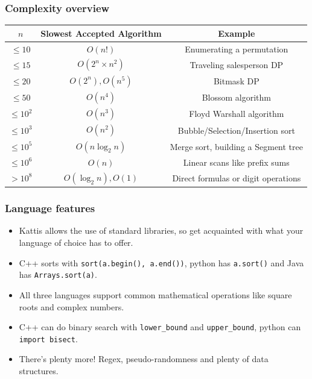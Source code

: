\documentclass{beamer}
\begin{document}
\begin{frame}[plain]
    \frametitle{Complexity overview}
    \scriptsize
    \begin{center}
        \begin{tabular}{c|c|c}
            $n$ & Slowest Accepted Algorithm & Example \\
            \hline
            $\leq 10$ & $O(n!)$ & Enumerating a permutation \\
            $\leq 15$ & $O(2^n\times n^2)$ & Traveling salesperson DP \\
            $\leq 20$ & $O(2^n), O(n^5)$ & Bitmask DP \\
            $\leq 50$ & $O(n^4)$ & Blossom algorithm \\
            $\leq 10^2$ & $O(n^3)$ & Floyd Warshall algorithm \\
            $\leq 10^3$ & $O(n^2)$ & Bubble/Selection/Insertion sort \\
            $\leq 10^5$ & $O(n\log_2{n})$ & Merge sort, building a Segment tree \\
            $\leq 10^6$ & $O(n)$ & Linear scans like prefix sums \\
            $> 10^8$ & $O(\log_2{n}), O(1)$ & Direct formulas or digit operations \\
        \end{tabular}
    \end{center}
\end{frame}

\begin{frame}[plain]
    \frametitle{Language features}
    \begin{itemize}
        \item Kattis allows the use of standard libraries, so get acquainted with what your language of choice has to offer.
        \item C++ sorts with \texttt{sort(a.begin(), a.end())}, python has \texttt{a.sort()} and Java has \texttt{Arrays.sort(a)}.
        \item All three languages support common mathematical operations like square roots and complex numbers.
        \item C++ can do binary search with \texttt{lower\_bound} and \texttt{upper\_bound}, python can \texttt{import bisect}.
        \item There's plenty more! Regex, pseudo-randomness and plenty of data structures.
    \end{itemize}
\end{frame}
\end{document}
